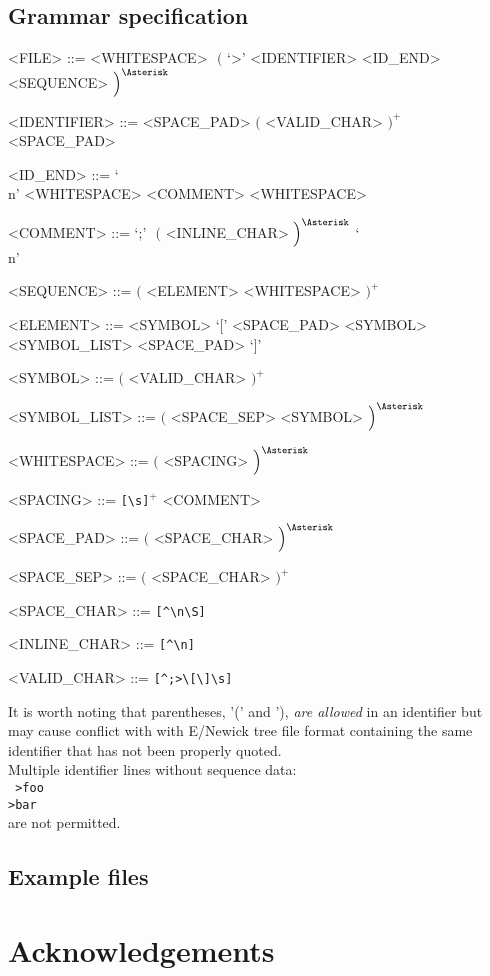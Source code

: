 \documentclass[12pt]{article}
\begin{document}
\pagebreak

\subsection{Grammar specification}

\setlength{\grammarparsep}{12pt plus 1pt minus 1pt} %
\setlength{\grammarindent}{10em} %

\begin{grammar}

  <FILE>         ::=  <WHITESPACE> $\,\,\Big($ `>' <IDENTIFIER> <ID_END> <SEQUENCE> $\Big)^{\Asterisk}$

  <IDENTIFIER>   ::=  <SPACE_PAD> $\Big($ <VALID_CHAR> $\Big)^{+}$ <SPACE_PAD>

  <ID_END>       ::=  `\\n' <WHITESPACE>
                 \alt <COMMENT> <WHITESPACE>

  <COMMENT>      ::=  `;' $\,\,\Big($ <INLINE_CHAR> $\Big)^{\Asterisk}$ `\\n'

  <SEQUENCE>     ::=  $\Big($ <ELEMENT> <WHITESPACE> $\Big)^{+}$
  
  <ELEMENT>      ::=  <SYMBOL>
                 \alt `[' <SPACE_PAD> <SYMBOL> <SYMBOL_LIST> <SPACE_PAD> `]'
 
  <SYMBOL>       ::=  $\Big($ <VALID_CHAR> $\Big)^{+}$
                 
  <SYMBOL_LIST>  ::=  $\Big($ <SPACE_SEP> <SYMBOL> $\Big)^{\Asterisk}$
  
  <WHITESPACE>   ::=  $\Big($ <SPACING> $\Big)^{\Asterisk}$

  <SPACING>      ::=  \verb![\s]!$^{+}$
                 \alt <COMMENT>

  <SPACE_PAD>    ::=  $\Big($ <SPACE_CHAR> $\Big)^{\Asterisk}$

  <SPACE_SEP>    ::=  $\Big($ <SPACE_CHAR> $\Big)^{+}$

  <SPACE_CHAR>   ::=  \verb![^\n\S]!

  <INLINE_CHAR>  ::=  \verb![^\n]!

  <VALID_CHAR>   ::=  \verb![^;>\[\]\s]!


  
\end{grammar}

It is worth noting that parentheses, '(' and '), \textit{are allowed} in an identifier but may cause conflict with with E/Newick tree file format \citep{Cardonaetal2008} containing the same identifier that has not been properly quoted. \\

Multiple identifier lines without sequence data:\\
\texttt{	
>foo\\
>bar\\
}
are not permitted.

\subsection{Example files}

\section{Acknowledgements}
\newpage

\end{document}
